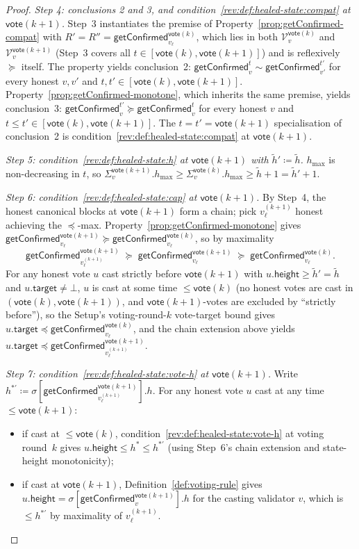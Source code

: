 \ifx\litemode\undefined\documentclass{article}\fi
\newcommand{\V}[0]{\ensuremath{\mathcal{V}}}
\newcommand{\target}{\mathsf{target}}
\newcommand{\height}{\mathsf{height}}
\newcommand{\hmax}{\ensuremath{h_{\max}}\xspace}
\newcommand{\vote}{\ensuremath{\mathsf{vote}}}
\newcommand{\comm}[1]{\ensuremath{\widetilde{#1}}}
\newcommand{\getConfirmed}{\textsf{getConfirmed}\xspace}
\theoremstyle{plain}
\theoremstyle{definition}
\theoremstyle{remark}
\begin{document}
\begin{proof}
\medskip

\emph{Step 4: conclusions 2 and 3, and condition~\ref{rev:def:healed-state:compat} at $\vote(k{+}1)$.}
Step~3 instantiates the premise of Property~\ref{prop:getConfirmed-compat} with $R' = R'' = \getConfirmed_{v_\ell}^{\vote(k)}$, which lies in both $\V_v^{\vote(k)}$ and $\V_v^{\vote(k+1)}$ (Step~3 covers all $t \in [\vote(k), \vote(k{+}1)]$) and is reflexively $\succeq$ itself.
The property yields conclusion~2: $\getConfirmed_v^t \sim \getConfirmed_{v'}^{t'}$ for every honest $v, v'$ and $t, t' \in [\vote(k), \vote(k{+}1)]$.
Property~\ref{prop:getConfirmed-monotone}, which inherits the same premise, yields conclusion~3: $\getConfirmed_v^{t'} \succeq \getConfirmed_v^t$ for every honest $v$ and $t \leq t' \in [\vote(k), \vote(k{+}1)]$.
The $t = t' = \vote(k{+}1)$ specialisation of conclusion~2 is condition~\ref{rev:def:healed-state:compat} at $\vote(k{+}1)$.

\emph{Step 5: condition~\ref{rev:def:healed-state:h} at $\vote(k{+}1)$ with $\comm{h}' \coloneqq \comm{h}$.}
$\hmax$ is non-decreasing in $t$, so $\Sigma_v^{\vote(k+1)}.\hmax \geq \Sigma_v^{\vote(k)}.\hmax \geq \comm{h} + 1 = \comm{h}' + 1$.

\emph{Step 6: condition~\ref{rev:def:healed-state:cap} at $\vote(k{+}1)$.}
By Step~4, the honest canonical blocks at $\vote(k{+}1)$ form a chain; pick $v_\ell^{(k+1)}$ honest achieving the $\preceq$-max.
Property~\ref{prop:getConfirmed-monotone} gives $\getConfirmed_{v_\ell}^{\vote(k+1)} \succeq \getConfirmed_{v_\ell}^{\vote(k)}$, so by maximality
\[
  \getConfirmed_{v_\ell^{(k+1)}}^{\vote(k+1)} \;\succeq\; \getConfirmed_{v_\ell}^{\vote(k+1)} \;\succeq\; \getConfirmed_{v_\ell}^{\vote(k)}.
\]
For any honest vote $u$ cast strictly before $\vote(k{+}1)$ with $u.\height \geq \comm{h}' = \comm{h}$ and $u.\target \neq \bot$, $u$ is cast at some time $\leq \vote(k)$ (no honest votes are cast in $(\vote(k), \vote(k{+}1))$, and $\vote(k{+}1)$-votes are excluded by ``strictly before''), so the Setup's voting-round-$k$ vote-target bound gives $u.\target \preceq \getConfirmed_{v_\ell}^{\vote(k)}$, and the chain extension above yields $u.\target \preceq \getConfirmed_{v_\ell^{(k+1)}}^{\vote(k+1)}$.

\emph{Step 7: condition~\ref{rev:def:healed-state:vote-h} at $\vote(k{+}1)$.}
Write $h^{\ast\prime} \coloneqq \sigma[\getConfirmed_{v_\ell^{(k+1)}}^{\vote(k+1)}].h$.
For any honest vote $u$ cast at any time $\leq \vote(k{+}1)$:
\begin{itemize}
  \item if cast at $\leq \vote(k)$, condition~\ref{rev:def:healed-state:vote-h} at voting round~$k$ gives $u.\height \leq h^\ast \leq h^{\ast\prime}$ (using Step~6's chain extension and state-height monotonicity);
  \item if cast at $\vote(k{+}1)$, Definition~\ref{def:voting-rule} gives $u.\height = \sigma[\getConfirmed_{v}^{\vote(k+1)}].h$ for the casting validator $v$, which is $\leq h^{\ast\prime}$ by maximality of $v_\ell^{(k+1)}$.
\end{itemize}
\end{proof}
\end{document}
